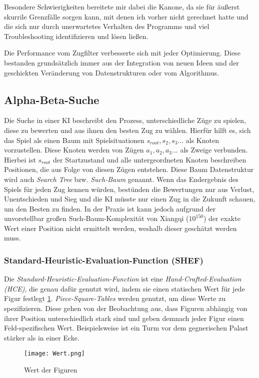 \documentclass{jpp}
\begin{document}
Besondere Schwierigkeiten bereitete mir dabei die Kanone, da sie für äußerst skurrile Grenzfälle sorgen kann, mit denen ich vorher nicht gerechnet hatte und die sich nur durch unerwartetes Verhalten des Programms und viel Troubleshooting identifizieren und lösen ließen.

Die Performance vom Zugfilter verbesserte sich mit jeder Optimierung. Diese bestanden grundsätzlich immer aus der Integration von neuen Ideen und der geschickten Veränderung von Datenstrukturen oder vom Algorithmus.

\subsection{Alpha-Beta-Suche}
Die Suche in einer KI beschreibt den Prozess, unterschiedliche Züge zu spielen, diese zu bewerten und aus ihnen den besten Zug zu wählen. Hierfür hilft es, sich das Spiel als einen Baum mit Spielsituationen {$s_{root}, s_2, s_3 ...$} als Knoten vorzustellen. Diese Knoten werden von Zügen {$a_1, a_2, a_3 ...$} als Zweige verbunden. Hierbei ist $s_{root}$ der Startzustand und alle untergeordneten Knoten beschreiben Positionen, die aus Folge von diesen Zügen entstehen. Diese Baum Datenstruktur wird auch \textit{Search Tree} bzw. \textit{Such-Baum} genannt. 
Wenn das Endergebnis des Spiels für jeden Zug kennen würden, bestünden die Bewertungen nur aus Verlust, Unentschieden und Sieg und die KI müsste nur einen Zug in die Zukunft schauen, um den Besten zu finden. In der Praxis ist kann jedoch aufgrund der unvorstellbar großen Such-Baum-Komplexität von Xiangqi ($10^{150}$) der exakte Wert einer Position nicht ermittelt werden, weshalb dieser geschätzt werden muss.
\subsubsection{Standard-Heuristic-Evaluation-Function (SHEF)}
Die \textit{Standard-Heuristic-Evaluation-Function} ist eine \textit{Hand-Crafted-Evaluation (HCE)}, die genau dafür genutzt wird, indem sie einen statischen Wert für jede Figur festlegt \ref{fig:wert}.
\textit{Piece-Square-Tables} werden genutzt, um diese Werte zu spezifizieren. Diese gehen von der Beobachtung aus, dass Figuren abhängig von ihrer Position unterschiedlich stark sind und geben demnach jeder Figur einen Feld-spezifischen Wert. Beispielsweise ist ein Turm vor dem gegnerischen Palast stärker als in einer Ecke.
\begin{figure}
\centering
\texttt{[image: Wert.png]}
\caption{Wert der Figuren}
\label{fig:wert}
\end{figure}
\end{document}
